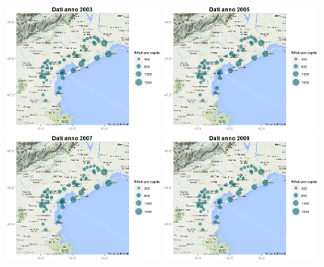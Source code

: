 \documentclass[a4paper,11pt,twoside,openright]{book}							%
\begin{document}
\begin{figure}[H]
	\includegraphics[trim=0cm 0cm 0cm 0cm,clip=true,width=0.45\textwidth]{Immagini/venezia_dati/Dati2003.png}
	\includegraphics[trim=0cm 0cm 0cm 0cm,clip=true,width=0.45\textwidth]{Immagini/venezia_dati/Dati2005.png}
	\includegraphics[trim=0cm 0cm 0cm 0cm,clip=true,width=0.45\textwidth]{Immagini/venezia_dati/Dati2007.png}
	\includegraphics[trim=0cm 0cm 0cm 0cm,clip=true,width=0.45\textwidth]{Immagini/venezia_dati/Dati2009.png}

\end{figure}
\end{document}
